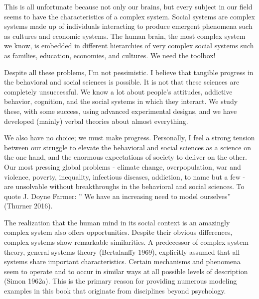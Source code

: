 \documentclass[
  a4paper,
  DIV=11,
  numbers=noendperiod,
  oneside]{scrreprt}
\begin{document}
This is all unfortunate because not only our brains, but every subject
in our field seems to have the characteristics of a complex system.
Social systems are complex systems made up of individuals interacting to
produce emergent phenomena such as cultures and economic systems. The
human brain, the most complex system we know, is embedded in different
hierarchies of very complex social systems such as families, education,
economies, and cultures. We need the toolbox!

Despite all these problems, I'm not pessimistic. I believe that tangible
progress in the behavioral and social sciences is possible. It is not
that these sciences are completely unsuccessful. We know a lot about
people's attitudes, addictive behavior, cognition, and the social
systems in which they interact. We study these, with some success, using
advanced experimental designs, and we have developed (mainly) verbal
theories about almost everything.

We also have no choice; we must make progress. Personally, I feel a
strong tension between our struggle to elevate the behavioral and social
sciences as a science on the one hand, and the enormous expectations of
society to deliver on the other. Our most pressing global problems -
climate change, overpopulation, war and violence, poverty, inequality,
infectious diseases, addiction, to name but a few - are unsolvable
without breakthroughs in the behavioral and social sciences. To quote J.
Doyne Farmer: '' We have an increasing need to model ourselves''
(Thurner 2016).

The realization that the human mind in its social context is an
amazingly complex system also offers opportunities. Despite their
obvious differences, complex systems show remarkable similarities. A
predecessor of complex system theory, general systems theory
(Bertalanffy 1969), explicitly assumed that all systems share important
characteristics. Certain mechanisms and phenomena seem to operate and to
occur in similar ways at all possible levels of description (Simon
1962a). This is the primary reason for providing numerous modeling
examples in this book that originate from disciplines beyond psychology.
\end{document}
